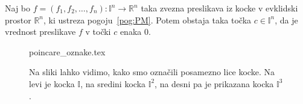 \documentclass[mat1]{fmfdelo}
\newcommand{\R}{\mathbb R}
\newcommand{\I}{\mathbb I}
\newcommand{\0}{0}
\begin{document}


\begin{izrek}\label{izr:PM}
Naj bo $f = (f_1, f_2, \dots, f_n) : \I^n  \to \R^n$ taka zvezna preslikava iz kocke v evklidski prostor $\R^n$, ki ustreza pogoju~\eqref{pog:PM}. Potem obstaja taka točka $c \in \I^n$, da je vrednost preslikave $f$ v točki $c$ enaka $\0$.
\end{izrek}
\begin{figure}[h!]
	\centering
	{poincare_oznake.tex}
	\caption{Na sliki lahko vidimo, kako smo označili posamezno lice kocke. Na levi je kocka $\I$, na sredini kocka $\I^2$, na desni pa je prikazana kocka $\I^3$ .}
\end{figure}
\end{document}
